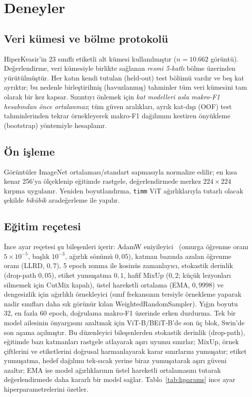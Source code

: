 \section{Deneyler}
\label{sec:setup}

\subsection{Veri kümesi ve bölme protokolü}
HiperKvasir'in 23 sınıflı etiketli alt kümesi kullanılmıştır ($n = 10{.}662$
görüntü). Değerlendirme, veri kümesiyle birlikte sağlanan \emph{resmi 5-katlı}
bölme üzerinden yürütülmüştür. Her katın kendi tutulan (held-out) test bölümü
vardır ve beş kat ayrıktır; bu nedenle birleştirilmiş (havuzlanmış) tahminler
tüm veri kümesini tam olarak bir kez kapsar. Sızıntıyı önlemek için \emph{kat
modelleri asla makro-F1 hesabından önce ortalanmaz}; tüm güven aralıkları, ayrık
kat-dışı (OOF) test tahminlerinden tekrar örnekleyerek makro-F1 dağılımını kestiren
önyükleme (bootstrap) yöntemiyle hesaplanır.

\subsection{Ön işleme}
Görüntüler ImageNet ortalaması/standart sapmasıyla normalize edilir; en kısa
kenar 256'ya ölçeklenip eğitimde rastgele, değerlendirmede merkez $224\times224$
kırpma uygulanır. Yeniden boyutlandırma, \texttt{timm} ViT ağırlıklarıyla
tutarlı olacak şekilde \emph{bikübik} aradeğerleme ile yapılır.

\subsection{Eğitim reçetesi}
İnce ayar reçetesi şu bileşenleri içerir: AdamW
eniyileyici~\cite{loshchilov2019adamw} (omurga öğrenme oranı $5\times10^{-5}$,
başlık $10^{-3}$, ağırlık sönümü $0{,}05$), katman bazında azalan öğrenme oranı
(LLRD, $0{,}7$), 5 epoch ısınma ile kosinüs zamanlayıcı, stokastik derinlik
(drop-path $0{,}05$), etiket yumuşatma $0{,}1$, hafif MixUp ($0{,}2$; küçük
lezyonları silmemek için CutMix kapalı), üstel hareketli ortalama (EMA, $0{,}9998$)
ve dengesizlik için ağırlıklı örnekleyici (sınıf frekansının tersiyle örnekleme
yaparak nadir sınıfları daha sık görünür kılan WeightedRandomSampler). Yığın boyutu
32, en fazla 60 epoch, doğrulama makro-F1 üzerinde erken durdurma. Tek bir model
ailesinin önyargısını azaltmak için ViT-B/BEiT-B'de son üç blok, Swin'de son
aşama açılmıştır. Bu düzenleyici bileşenlerden stokastik derinlik (drop-path),
eğitimde bazı katmanları rastgele atlayarak aşırı uyumu sınırlar; MixUp, örnek
çiftlerini ve etiketlerini doğrusal harmanlayarak karar sınırlarını yumuşatır;
etiket yumuşatma, hedef dağılımı tek-sıcak yerine biraz yumuşatarak aşırı güveni
azaltır; EMA ise model ağırlıklarının üstel hareketli ortalamasını tutarak
değerlendirmede daha kararlı bir model sağlar. Tablo~\ref{tab:hparams} ince ayar
hiperparametrelerini özetler.

